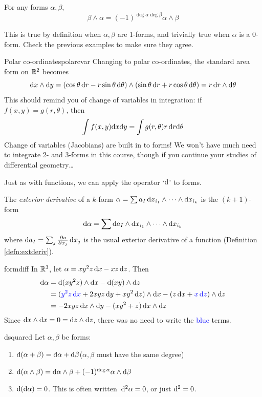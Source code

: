 \begin{lemm}{}{}
For any forms $\alpha,\beta$,
\[\beta\wedge\alpha=(-1)^{\deg\alpha\deg\beta}\alpha\wedge\beta\]
\end{lemm}


This is true by definition when $\alpha,\beta$ are 1-forms, and trivially true when $\alpha$ is a 0-form. Check the previous examples to make sure they agree.


\begin{example}{Polar co-ordinates}{polarcvar}
Changing to polar co-ordinates, the standard area form on $\R^2$ becomes
\[\dx\wedge\dy =(\cos\theta\,\dr-r\sin\theta\,\dth)\wedge (\sin\theta\,\dr+r\cos\theta\,\dth)=r\,\dr\wedge\dth\]
This should remind you of change of variables in integration: if $f(x,y)=g(r,\theta)$, then
\[\int f(x,y)\dx\dy=\int g(r,\theta)r\,\dr\dth\]
Change of variables (Jacobians) are built in to forms! We won't have much need to integrate 2- and 3-forms in this course, though if you continue your studies of differential geometry\ldots
\end{example}



Just as with functions, we can apply the operator `$\D$' to forms.

\begin{defn}{}{}
The \emph{exterior derivative} of a $k$-form $\alpha=\sum a_I\,\dx_{i_1}\wedge\cdots\wedge\dx_{i_k}$ is the $(k+1)$-form
\[\D\alpha=\sum \D a_I\wedge\dx_{i_1}\wedge\cdots\wedge\dx_{i_k}\]
where $\D a_I=\sum_j \partials[a]{x_j}\,\dx_j$ is the usual exterior derivative of a function (Definition \ref{defn:extderiv}).
\end{defn}

\begin{example}{}{formdiff}
In $\R^3$, let $\alpha=xy^2z\,\dx-xz\,\dz$. Then
\begin{align*}
\D\alpha&=\D(xy^2z)\wedge\dx-\D(xy)\wedge\dz\\
&=(\textcolor{blue}{y^2z\,\dx}+2xyz\,\dy+xy^2\,\dz)\wedge\dx -(z\,\dx+\textcolor{blue}{x\,\dz})\wedge\dz\\
&=-2xyz\,\dx\wedge\dy -(xy^2+z)\,\dx\wedge\dz
\end{align*}
Since $\dx\wedge\dx=0=\dz\wedge\dz$, there was no need to write the \textcolor{blue}{blue} terms.
\end{example}


\begin{thm}{}{dsquared}
Let $\alpha,\beta$ be forms:
\begin{enumerate}
  \item $\D(\alpha+\beta)=\D\alpha+\D\beta$\quad ($\alpha,\beta$ must have the same degree)
  \item $\D(\alpha\wedge\beta)=\D\alpha\wedge\beta+(-1)^{\deg\alpha}\alpha\wedge\D\beta$
  \item $\D(\D\alpha)=0$. This is often written\footnotemark\  $\D^2\alpha=0$, or just $\D^2=0$.
\end{enumerate}
\end{thm}


